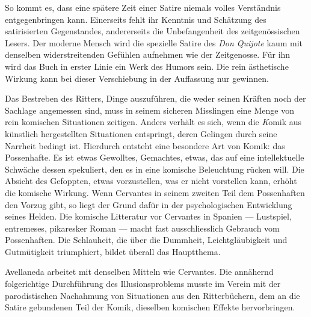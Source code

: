 So kommt es, dass eine spätere Zeit einer Satire niemals volles
Verständnis entgegenbringen kann. Einerseits fehlt ihr Kenntnis und
Schätzung des satirisierten Gegenstandes, andererseits die Unbefangenheit
des zeitgenössischen Lesers. Der moderne Mensch wird die spezielle
Satire des {\it Don Quijote} kaum mit denselben widerstreitenden Gefühlen
aufnehmen wie der Zeitgenosse. Für ihn wird das Buch in erster Linie
ein Werk des Humors sein. Die rein ästhetische Wirkung kann bei
dieser Verschiebung in der Auffassung nur gewinnen.

Das Bestreben des Ritters, Dinge auszuführen, die weder seinen
Kräften noch der Sachlage angemessen sind, muss in seinem sicheren
Misslingen eine Menge von rein komischen Situationen zeitigen.
Anders verhält es sich, wenn die {\emph Komik} aus künstlich hergestellten
Situationen entspringt, deren Gelingen durch seine Narrheit bedingt ist.
Hierdurch entsteht eine besondere Art von Komik: {\quoted das Possenhafte}.
Es ist etwas Gewolltes, Gemachtes, etwas, das auf eine intellektuelle
Schwäche dessen spekuliert, den es in eine komische Beleuchtung rücken
will. Die Absicht des Gefoppten, etwas vorzustellen, was er nicht vorstellen
kann, erhöht die komische Wirkung. Wenn Cervantes in seinem
zweiten Teil dem Possenhaften den Vorzug gibt, so liegt der Grund
dafür in der psychologischen Entwicklung seines Helden. Die komische
Litteratur vor Cervantes in Spanien --- Lustspiel, {\quoted entremeses}, pikaresker
Roman --- macht fast ausschliesslich Gebrauch vom Possenhaften. Die
Schlauheit, die über die Dummheit, Leichtgläubigkeit und Gutmütigkeit
triumphiert, bildet überall das Hauptthema.

Avellaneda arbeitet mit denselben Mitteln wie Cervantes. Die annähernd
folgerichtige Durchführung des Illusionsproblems musste im
Verein mit der parodistischen Nachahmung von Situationen aus den
Ritterbüchern, dem an die Satire gebundenen Teil der Komik, dieselben
komischen Effekte hervorbringen.

